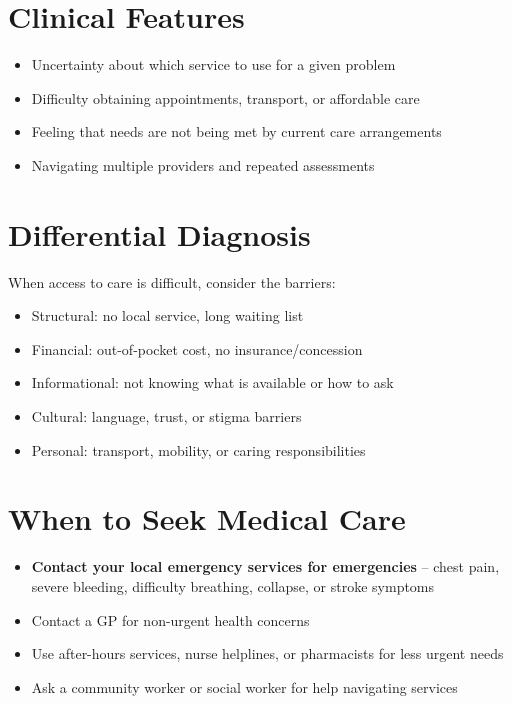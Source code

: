 \section*{Clinical Features}
\begin{itemize}
    \item Uncertainty about which service to use for a given problem
    \item Difficulty obtaining appointments, transport, or affordable care
    \item Feeling that needs are not being met by current care arrangements
    \item Navigating multiple providers and repeated assessments
\end{itemize}

\section*{Differential Diagnosis}
When access to care is difficult, consider the barriers:
\begin{itemize}
    \item Structural: no local service, long waiting list
    \item Financial: out-of-pocket cost, no insurance/concession
    \item Informational: not knowing what is available or how to ask
    \item Cultural: language, trust, or stigma barriers
    \item Personal: transport, mobility, or caring responsibilities
\end{itemize}

\section*{When to Seek Medical Care}
\begin{itemize}
    \item \textbf{Contact your local emergency services for emergencies} -- chest pain, severe bleeding, difficulty breathing, collapse, or stroke symptoms
    \item Contact a GP for non-urgent health concerns
    \item Use after-hours services, nurse helplines, or pharmacists for less urgent needs
    \item Ask a community worker or social worker for help navigating services
\end{itemize}

